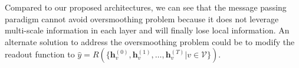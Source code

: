 \documentclass{article}
\begin{document}

Compared to our proposed architectures, we can see that the message passing paradigm cannot avoid oversmoothing problem because it does not leverage multi-scale information in each layer and will finally lose local information. An alternate solution to address the oversmoothing problem could be to modify the readout function to $\hat{y} = R(\{\bm{h}_v^{(0)},\bm{h}_v^{(1)},\dots,\bm{h}_v^{(T)} | v \in \mathcal{V}\})$.
\end{document}
